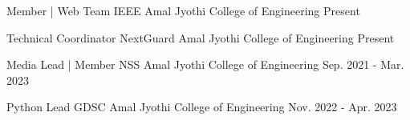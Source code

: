 
\begin{cventries}
  \cventry
    {Member | Web Team} %
    {IEEE} %
    {Amal Jyothi College of Engineering}
    {Present} %
    {}
\end{cventries}
\vspace{-1.5\baselineskip}
\begin{cventries}
  \cventry
    {Technical Coordinator} %
    {NextGuard} %
    {Amal Jyothi College of Engineering}
    {Present} %
    {}
\end{cventries}
\vspace{-1.5\baselineskip}
\begin{cventries}
  \cventry
    {Media Lead | Member} %
    {NSS} %
    {Amal Jyothi College of Engineering}
    {Sep. 2021 - Mar. 2023} %
    {}
\end{cventries}
\vspace{-1.5\baselineskip}
\begin{cventries}
  \cventry
    {Python Lead} %
    {GDSC} %
    {Amal Jyothi College of Engineering}
    {Nov. 2022 - Apr. 2023} %
    {}
\end{cventries}